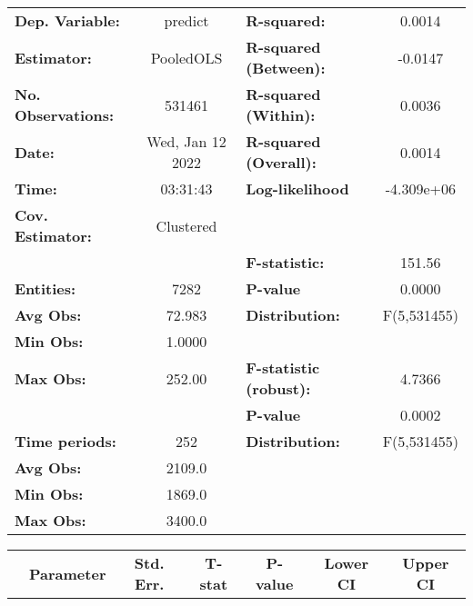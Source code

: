 \begin{center}
\begin{tabular}{lclc}
\toprule
\textbf{Dep. Variable:}    &      predict       & \textbf{  R-squared:         }   &      0.0014      \\
\textbf{Estimator:}        &     PooledOLS      & \textbf{  R-squared (Between):}  &     -0.0147      \\
\textbf{No. Observations:} &       531461       & \textbf{  R-squared (Within):}   &      0.0036      \\
\textbf{Date:}             &  Wed, Jan 12 2022  & \textbf{  R-squared (Overall):}  &      0.0014      \\
\textbf{Time:}             &      03:31:43      & \textbf{  Log-likelihood     }   &    -4.309e+06    \\
\textbf{Cov. Estimator:}   &     Clustered      & \textbf{                     }   &                  \\
\textbf{}                  &                    & \textbf{  F-statistic:       }   &      151.56      \\
\textbf{Entities:}         &        7282        & \textbf{  P-value            }   &      0.0000      \\
\textbf{Avg Obs:}          &       72.983       & \textbf{  Distribution:      }   &   F(5,531455)    \\
\textbf{Min Obs:}          &       1.0000       & \textbf{                     }   &                  \\
\textbf{Max Obs:}          &       252.00       & \textbf{  F-statistic (robust):} &      4.7366      \\
\textbf{}                  &                    & \textbf{  P-value            }   &      0.0002      \\
\textbf{Time periods:}     &        252         & \textbf{  Distribution:      }   &   F(5,531455)    \\
\textbf{Avg Obs:}          &       2109.0       & \textbf{                     }   &                  \\
\textbf{Min Obs:}          &       1869.0       & \textbf{                     }   &                  \\
\textbf{Max Obs:}          &       3400.0       & \textbf{                     }   &                  \\
\bottomrule
\end{tabular}
\begin{tabular}{lcccccc}
                & \textbf{Parameter} & \textbf{Std. Err.} & \textbf{T-stat} & \textbf{P-value} & \textbf{Lower CI} & \textbf{Upper CI}  \\

\end{tabular}
\end{center}
